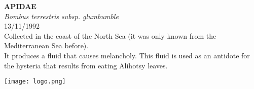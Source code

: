 \documentclass[
  landscape]{article}
\begin{document}
\begin{mdframed}[linecolor=mycolortext, linewidth=2pt, backgroundcolor=mycolor]

  \bigskip
  \begin{flushright}
  \begin{minipage}[t][-50ex][t]{16em}  
  \end{minipage}
  \end{flushright}
  \bigskip
  \begin{adjustwidth}{1cm}{1cm}
  {\fontsize{50pt}{0pt}\selectfont\bf\textcolor{mycolortext}{ APIDAE }} \\
  \linebreak
  \linebreak
  {\fontsize{40pt}{100pt}\selectfont\textcolor{mycolortext}{\emph{ Bombus terrestris subsp. glumbumble }}} \\
  \vfill
  {\fontsize{30pt}{100pt}\selectfont\textcolor{mycolortext}{ 13/11/1992 }} \\
  \vfill
  {\fontsize{30pt}{100pt}\selectfont\textcolor{mycolortext}{ Collected in the coast of the North Sea (it was only known from the Mediterranean Sea before). }} \\
  \vfill
  {\fontsize{30pt}{50pt}\selectfont\textcolor{mycolortext}{ It produces a fluid that causes melancholy. This fluid is used as an antidote for the hysteria that results from eating Alihotsy leaves. }} \\
  \end{adjustwidth}
  \begin{center}
  \texttt{[image: logo.png]}
  \end{center}
  \end{mdframed}
  \pagebreak

\end{document}
